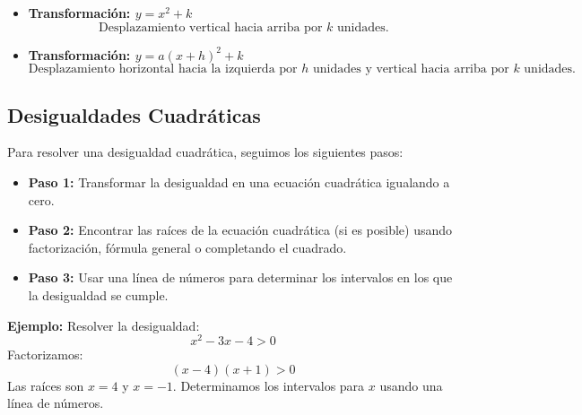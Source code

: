 \begin{itemize}
            
            
        
        
        \item \textbf{Transformación: \(y = x^2 + k\)}
        \[
        \text{Desplazamiento vertical hacia arriba por } k \text{ unidades}.
        \]
        
        \item \textbf{Transformación: \(y = a(x + h)^2 + k\)}
        \[
        \text{Desplazamiento horizontal hacia la izquierda por } h \text{ unidades y vertical hacia arriba por } k \text{ unidades}.
        \]
    \end{itemize}
    
    \subsection{Desigualdades Cuadráticas}
    
    Para resolver una desigualdad cuadrática, seguimos los siguientes pasos:
    
    \begin{itemize}
        \item \textbf{Paso 1:} Transformar la desigualdad en una ecuación cuadrática igualando a cero.
        
        \item \textbf{Paso 2:} Encontrar las raíces de la ecuación cuadrática (si es posible) usando factorización, fórmula general o completando el cuadrado.
        
        \item \textbf{Paso 3:} Usar una línea de números para determinar los intervalos en los que la desigualdad se cumple.
    \end{itemize}
    
    \textbf{Ejemplo:} Resolver la desigualdad:
    \[
    x^2 - 3x - 4 > 0
    \]
    Factorizamos:
    \[
    (x - 4)(x + 1) > 0
    \]
    Las raíces son \(x = 4\) y \(x = -1\). Determinamos los intervalos para \(x\) usando una línea de números.
    
